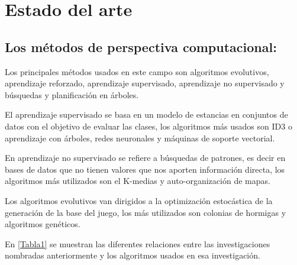 \chapter[Estado del arte]{\label{identificadorReferenciaCruzada}
Estado del arte}

\section{Los métodos de perspectiva computacional:}

Los principales métodos usados en este campo son algoritmos evolutivos, aprendizaje reforzado, aprendizaje supervisado, aprendizaje no supervisado y búsquedas y planificación en árboles.

El aprendizaje supervisado se basa en un modelo de estancias en conjuntos de datos con el objetivo de evaluar las clases, los algoritmos más usados son ID3 o aprendizaje con árboles, redes neuronales y máquinas de soporte vectorial.
	
En aprendizaje no supervisado se refiere a búsquedas de patrones, es decir en bases de datos que no tienen valores que nos aporten información directa, los algoritmos más utilizados son el K-medias y auto-organización de mapas.

Los algoritmos evolutivos van dirigidos a la optimización estocástica de la generación de la base del juego, los más utilizados son colonias de hormigas y algoritmos genéticos.

En \ref{Tabla1} se muestran las diferentes relaciones entre las investigaciones nombradas anteriormente y los algoritmos usados en esa investigación.


